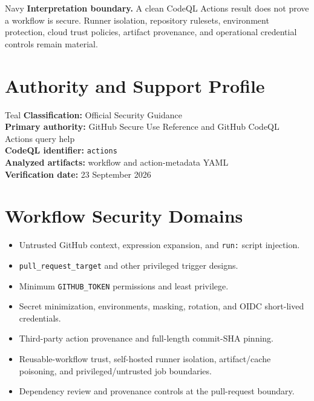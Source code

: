 \documentclass[10pt,letterpaper]{article}
\newcommand{\code}[1]{\texttt{\small #1}}
\begin{document}
\begin{callout}{Navy}
\textbf{Interpretation boundary.} A clean CodeQL Actions result does not prove a workflow is secure. Runner isolation, repository rulesets, environment protection, cloud trust policies, artifact provenance, and operational credential controls remain material.
\end{callout}

\section{Authority and Support Profile}
\begin{callout}{Teal}
\textbf{Classification:} Official Security Guidance\\
\textbf{Primary authority:} GitHub Secure Use Reference and GitHub CodeQL Actions query help\\
\textbf{CodeQL identifier:} \code{actions}\\
\textbf{Analyzed artifacts:} workflow and action-metadata YAML\\
\textbf{Verification date:} 23 September 2026
\end{callout}

\section{Workflow Security Domains}
\begin{itemize}[leftmargin=*]
\item Untrusted GitHub context, expression expansion, and \code{run:} script injection.
\item \code{pull\_request\_target} and other privileged trigger designs.
\item Minimum \code{GITHUB\_TOKEN} permissions and least privilege.
\item Secret minimization, environments, masking, rotation, and OIDC short-lived credentials.
\item Third-party action provenance and full-length commit-SHA pinning.
\item Reusable-workflow trust, self-hosted runner isolation, artifact/cache poisoning, and privileged/untrusted job boundaries.
\item Dependency review and provenance controls at the pull-request boundary.
\end{itemize}
\end{document}

